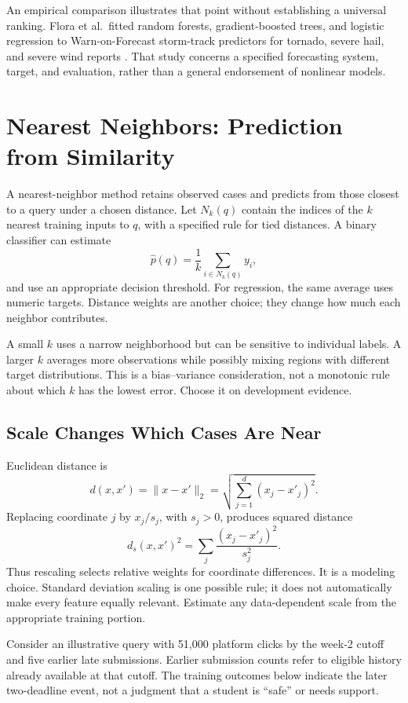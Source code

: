 An empirical comparison illustrates that point without establishing a universal ranking. Flora et al.\ fitted random forests, gradient-boosted trees, and logistic regression to Warn-on-Forecast storm-track predictors for tornado, severe hail, and severe wind reports \citep{flora2021}. That study concerns a specified forecasting system, target, and evaluation, rather than a general endorsement of nonlinear models.

\section{Nearest Neighbors: Prediction from Similarity}

A nearest-neighbor method retains observed cases and predicts from those closest to a query under a chosen distance. Let $N_k(q)$ contain the indices of the $k$ nearest training inputs to $q$, with a specified rule for tied distances. A binary classifier can estimate
\[
\hat p(q)=\frac1k\sum_{i\in N_k(q)}y_i,
\]
and use an appropriate decision threshold. For regression, the same average uses numeric targets. Distance weights are another choice; they change how much each neighbor contributes.

A small $k$ uses a narrow neighborhood but can be sensitive to individual labels. A larger $k$ averages more observations while possibly mixing regions with different target distributions. This is a bias--variance consideration, not a monotonic rule about which $k$ has the lowest error. Choose it on development evidence.

\subsection{Scale Changes Which Cases Are Near}

Euclidean distance is
\[
d(x,x')=\|x-x'\|_2=\sqrt{\sum_{j=1}^d(x_j-x'_j)^2}.
\]
Replacing coordinate $j$ by $x_j/s_j$, with $s_j>0$, produces squared distance
\[
d_s(x,x')^2=\sum_j\frac{(x_j-x'_j)^2}{s_j^2}.
\]
Thus rescaling selects relative weights for coordinate differences. It is a modeling choice. Standard deviation scaling is one possible rule; it does not automatically make every feature equally relevant. Estimate any data-dependent scale from the appropriate training portion.

Consider an illustrative query with 51{,}000 platform clicks by the week-2 cutoff and five earlier late submissions. Earlier submission counts refer to eligible history already available at that cutoff. The training outcomes below indicate the later two-deadline event, not a judgment that a student is ``safe'' or needs support.

